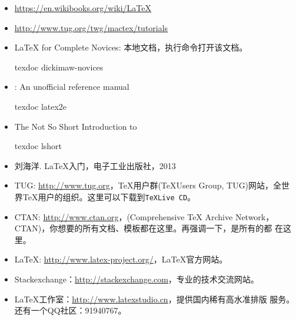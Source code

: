 \begin{itemize}
\item \url{https://en.wikibooks.org/wiki/LaTeX}
\item \url{http://www.tug.org/twg/mactex/tutorials}
\item \LaTeX{} for Complete Novices: 本地文档，执行命令打开该文档。
  \begin{cmd} texdoc dickimaw-novices
  \end{cmd}
 \item \LaTeXe{}: An unofficial reference manual
  \begin{cmd} texdoc latex2e
 \end{cmd}
 \item The Not So Short Introduction to \LaTeXe{}
   \begin{cmd} texdoc lshort
   \end{cmd}
\item 刘海洋. \LaTeX{}入门，电子工业出版社，2013
\item TUG: \url{http://www.tug.org}，\TeX{}用户群(\TeX Users Group,
  TUG)网站，全世界\TeX{}用户的组织。这里可以下载到\texttt{TeXLive CD}。
\item CTAN: \url{http://www.ctan.org}，(Comprehensive TeX Archive
  Network，CTAN)，你想要的所有文档、模板都在这里。再强调一下，是所有的都
  在这里。
\item LaTeX: \url{http://www.latex-project.org/}，\LaTeX{}官方网站。
\item Stackexchange：\url{http://stackexchange.com}，专业的技术交流网站。
\item \LaTeX{}工作室：\url{http://www.latexstudio.cn}，提供国内稀有高水准排版
  服务。还有一个QQ社区：91940767。
\end{itemize}

